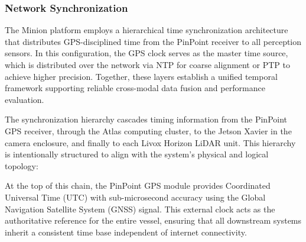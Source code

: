 \documentclass{erauthesis}
\begin{document}

\subsubsection{Network Synchronization} \label{time_sync_lan}

The Minion platform employs a hierarchical time synchronization architecture that distributes GPS-disciplined time from the PinPoint receiver to all perception sensors.
In this configuration, the GPS clock serves as the master time source, which is distributed over the network via \ac{NTP} for coarse alignment or \ac{PTP} to achieve higher precision.
Together, these layers establish a unified temporal framework supporting reliable cross-modal data fusion and performance evaluation.

The synchronization hierarchy cascades timing information from the PinPoint GPS receiver, through the Atlas computing cluster, to the Jetson Xavier in the camera enclosure, and finally to each Livox Horizon LiDAR unit. This hierarchy is intentionally structured to align with the system’s physical and logical topology:


At the top of this chain, the PinPoint GPS module provides Coordinated Universal Time (UTC) with sub-microsecond accuracy using the Global Navigation Satellite System (GNSS) signal. This external clock acts as the authoritative reference for the entire vessel, ensuring that all downstream systems inherit a consistent time base independent of internet connectivity.
\end{document}
